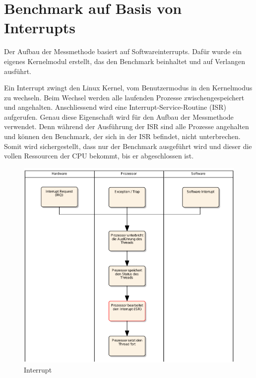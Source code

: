 
\section{Benchmark auf Basis von Interrupts}
\label{chap:benchmark_basis_interrupts}



Der Aufbau der Messmethode basiert auf Softwareinterrupts. Dafür wurde ein eigenes Kernel\-modul erstellt, das den Benchmark beinhaltet und auf Verlangen ausführt.
\par
Ein Interrupt zwingt den Linux Kernel, vom Benutzermodus in den Kernelmodus zu wechseln\cite{Mandl2010_3}. Beim Wechsel werden alle laufenden Prozesse zwischengespeichert und angehalten. Anschliessend wird eine Interrupt-Service-Routine (ISR) aufgerufen. Genau diese Eigenschaft wird für den Aufbau der Messmethode verwendet. Denn während der Ausführung der ISR sind alle Prozesse angehalten und können den Benchmark, der sich in der ISR befindet, nicht unterbrechen. Somit wird sichergestellt, dass nur der Benchmark ausgeführt wird und dieser die vollen Ressourcen der CPU bekommt, bis er abgeschlossen ist.
\par

\begin{figure}
\centering
\includegraphics[scale=0.45]{images/interrupt_ea.pdf}
\caption{Interrupt}
\label{fig:Interrupt}
\end{figure}

